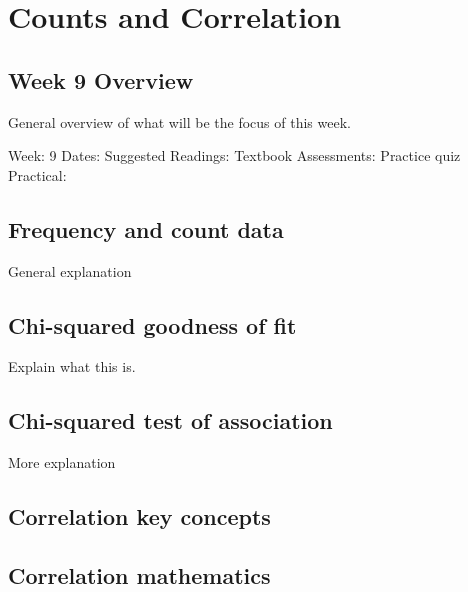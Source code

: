 \documentclass[
]{scrbook}
\begin{document}
\hypertarget{part-counts-and-correlation}{%
\part{Counts and Correlation}\label{part-counts-and-correlation}}

\hypertarget{Week9}{%
\chapter*{Week 9 Overview}\label{Week9}}

General overview of what will be the focus of this week.

Week: 9
Dates:
Suggested Readings: Textbook
Assessments: Practice quiz
Practical:

\hypertarget{frequency-and-count-data}{%
\chapter{Frequency and count data}\label{frequency-and-count-data}}

General explanation

\hypertarget{chi-squared-goodness-of-fit}{%
\chapter{Chi-squared goodness of fit}\label{chi-squared-goodness-of-fit}}

Explain what this is.

\hypertarget{chi-squared-test-of-association}{%
\chapter{Chi-squared test of association}\label{chi-squared-test-of-association}}

More explanation

\hypertarget{correlation-key-concepts}{%
\chapter{Correlation key concepts}\label{correlation-key-concepts}}

\hypertarget{correlation-mathematics}{%
\chapter{Correlation mathematics}\label{correlation-mathematics}}
\end{document}
